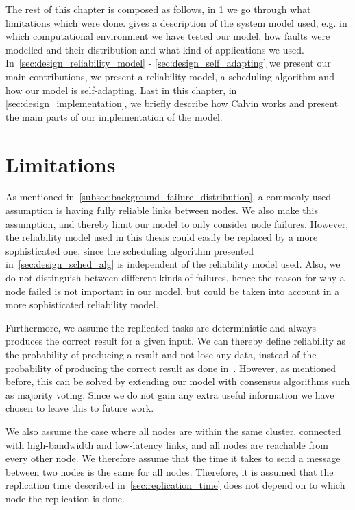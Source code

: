\documentclass{cslthse-msc}
\begin{document}
The rest of this chapter is composed as follows, in \cref{sec:design_limitations} we go through what limitations which were done.  gives a description of the system model used, e.g. in which computational environment we have tested our model, how faults were modelled and their distribution and what kind of applications we used. In~\cref{sec:design_reliability_model} - \cref{sec:design_self_adapting} we present our main contributions, we present a reliability model, a scheduling algorithm and how our model is self-adapting. Last in this chapter, in \cref{sec:design_implementation}, we briefly describe how Calvin works and present the main parts of our implementation of the model.

\section{Limitations} \label{sec:design_limitations}
As mentioned in~\cref{subsec:background_failure_distribution}, a commonly used assumption is having fully reliable links between nodes. We also make this assumption, and thereby limit our model to only consider node failures. However, the reliability model used in this thesis could easily be replaced by a more sophisticated one, since the scheduling algorithm presented in~\cref{sec:design_sched_alg} is independent of the reliability model used. Also, we do not distinguish between different kinds of failures, hence the reason for why a node failed is not important in our model, but could be taken into account in a more sophisticated reliability model.

Furthermore, we assume the replicated tasks are deterministic and always produces the correct result for a given input. We can thereby define reliability as the probability of producing a result and not lose any data, instead of the probability of producing the correct result as done in~\cite{selfAdaptRel, dynAdaptRepl, relModelWebServices}.  However, as mentioned before, this can be solved by extending our model with consensus algorithms such as majority voting. Since we do not gain any extra useful information we have chosen to leave this to future work.

We also assume the case where all nodes are within the same cluster, connected with high-bandwidth and low-latency links, and all nodes are reachable from every other node. We therefore assume that the time it takes to send a message between two nodes is the same for all nodes. Therefore, it is assumed that the replication time described in~\cref{sec:replication_time} does not depend on to which node the replication is done.
\end{document}
